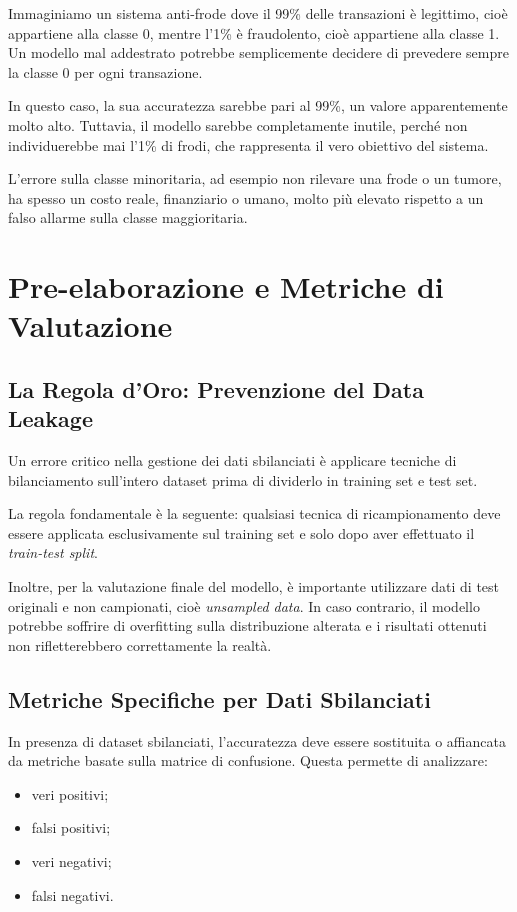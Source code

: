 \documentclass[11pt, a4paper]{article}
\begin{document}
Immaginiamo un sistema anti-frode dove il 99\% delle transazioni è legittimo,
cioè appartiene alla classe 0, mentre l'1\% è fraudolento, cioè appartiene alla
classe 1. Un modello mal addestrato potrebbe semplicemente decidere di prevedere
sempre la classe 0 per ogni transazione.

In questo caso, la sua accuratezza sarebbe pari al 99\%, un valore apparentemente
molto alto. Tuttavia, il modello sarebbe completamente inutile, perché non
individuerebbe mai l'1\% di frodi, che rappresenta il vero obiettivo del sistema.

L'errore sulla classe minoritaria, ad esempio non rilevare una frode o un tumore,
ha spesso un costo reale, finanziario o umano, molto più elevato rispetto a un
falso allarme sulla classe maggioritaria.

\section{Pre-elaborazione e Metriche di Valutazione}

\subsection{La Regola d'Oro: Prevenzione del Data Leakage}

Un errore critico nella gestione dei dati sbilanciati è applicare tecniche di
bilanciamento sull'intero dataset prima di dividerlo in training set e test set.

La regola fondamentale è la seguente: qualsiasi tecnica di ricampionamento deve
essere applicata esclusivamente sul training set e solo dopo aver effettuato il
\emph{train-test split}.

Inoltre, per la valutazione finale del modello, è importante utilizzare dati di
test originali e non campionati, cioè \emph{unsampled data}. In caso contrario,
il modello potrebbe soffrire di overfitting sulla distribuzione alterata e i
risultati ottenuti non rifletterebbero correttamente la realtà.

\subsection{Metriche Specifiche per Dati Sbilanciati}

In presenza di dataset sbilanciati, l'accuratezza deve essere sostituita o
affiancata da metriche basate sulla matrice di confusione. Questa permette di
analizzare:

\begin{itemize}
    \item veri positivi;
    \item falsi positivi;
    \item veri negativi;
    \item falsi negativi.
\end{itemize}
\end{document}
